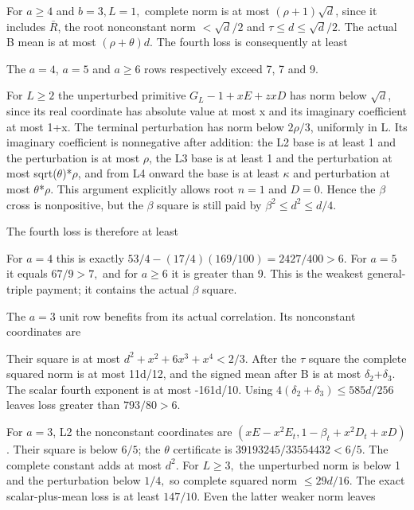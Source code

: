 For \(a\ge 4\) and \(b=3,\allowbreak \allowbreak  L=1,\allowbreak \allowbreak  \) complete norm is at most \((\rho+1)\sqrt{d}\), since it includes \(\bar R\), the root nonconstant norm \(<\sqrt{d}/2\) and \(\tau\le d\le \sqrt{d}/2.\) The actual B mean is at most \((\rho+\theta)d\). The fourth loss is consequently at least



The \(a=4\), \(a=5\) and \(a\ge 6\) rows respectively exceed 7, 7 and 9.

For \(L\ge 2\) the unperturbed primitive \(G_L-1+xE+zxD\) has norm below \(\sqrt{d}\), since its real coordinate has absolute value at most x and its imaginary coefficient at most 1+x. The terminal perturbation has norm below \(2\rho/3\), uniformly in L. Its imaginary coefficient is nonnegative after addition: the L2 base is at least 1 and the perturbation is at most \(\rho\), the L3 base is at least 1 and the perturbation at most sqrt(\(\theta\))*\(\rho\), and from L4 onward the base is at least \(\kappa\) and perturbation at most \(\theta\)*\(\rho\). This argument explicitly allows root \(n=1\) and \(D=0.\) Hence the \(\beta\) cross is nonpositive, but the \(\beta\) square is still paid by \(\beta^2\le d^2\le d/4\).

The fourth loss is therefore at least



For \(a=4\) this is exactly \(53/4-(17/4)(169/100)=2427/400>6\). For \(a=5\) it equals \(67/9>7,\allowbreak \) and for \(a\ge 6\) it is greater than 9. This is the weakest general-triple payment; it contains the actual \(\beta\) square.

The \(a=3\) unit row benefits from its actual correlation. Its nonconstant coordinates are



Their square is at most \(d^2+x^2+6x^3+x^4<2/3\). After the \(\tau\) square the complete squared norm is at most 11d/12, and the signed mean after B is at most \(\delta_2\)+\(\delta_3\). The scalar fourth exponent is at most -161d/10. Using \(4(\delta_2+\delta_3)\le 585d/256\) leaves loss greater than \(793/80>6.\)

For \(a=3\), L2 the nonconstant coordinates are \((xE-x^2E_t,\allowbreak \allowbreak  1-\beta_t+x^2D_t+xD)\). Their square is below \(6/5\); the \(\theta\) certificate is \(39193245/33554432<6/5\). The complete constant adds at most \(d^2.\) For \(L\ge 3,\allowbreak \allowbreak  \) the unperturbed norm is below 1 and the perturbation below \(1/4,\allowbreak \) so complete squared norm \(\le 29d/16.\) The exact scalar-plus-mean loss is at least \(147/10.\) Even the latter weaker norm leaves

